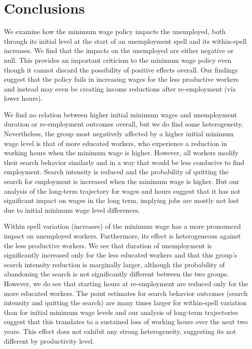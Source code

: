 \documentclass{article}
\begin{document}
\section{Conclusions}

We examine how the minimum wage policy impacts the unemployed, both through its initial level at the start of an unemployment spell and its within-spell increases. We find that the impacts on the unemployed are either negative or null. This provides an important criticism to the minimum wage policy even though it cannot discard the possibility of positive effects overall. Our findings suggest that the policy fails in increasing wages for the less productive workers and instead may even be creating income reductions after re-employment (via lower hours).

We find no relation between higher initial minimum wages and unemployment duration or re-employment outcomes overall, but we do find some heterogeneity. Nevertheless, the group most negatively affected by a higher initial minimum wage level is that of more educated workers, who experience a reduction in working hours when the minimum wage is higher. However, all workers modify their search behavior similarly and in a way that would be less conducive to find employment. Search intensity is reduced and the probability of quitting the search for employment is increased when the minimum wage is higher. But our analysis of the long-term trajectory for wages and hours suggest that it has not significant impact on wages in the long term, implying jobs are mostly not lost due to initial minimum wage level differences.

Within spell variation (increases) of the minimum wage has a more pronounced impact on unemployed workers. Furthermore, its effect is heterogeneous against the less productive workers. We see that duration of unemployment is significantly increased only for the less educated workers and that this group's search intensity reduction is marginally larger, although the probability of abandoning the search is not significantly different between the two groups. However, we do see that starting hours at re-employment are reduced only for the more educated workers. The point estimates for search behavior outcomes (search intensity and quitting the search) are many times larger for within-spell variation than for initial minimum wage levels and our analysis of long-term trajectories suggest that this translates to a sustained loss of working hours over the next two years. This effect does not exhibit any strong heterogeneity, suggesting its not different by productivity level. 
\end{document}
